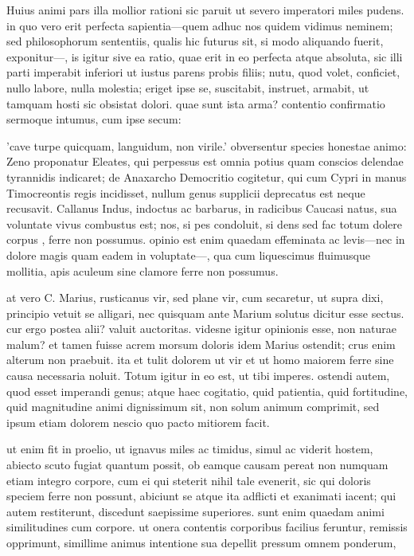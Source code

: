  Huius animi pars illa mollior rationi sic paruit ut severo imperatori miles pudens. in quo vero erit perfecta sapientia—quem adhuc nos quidem vidimus neminem; sed philosophorum sententiis, qualis hic futurus sit, si modo aliquando fuerit, exponitur—, is igitur sive ea ratio, quae erit in eo perfecta atque absoluta, sic illi parti imperabit inferiori ut iustus parens probis filiis; nutu, quod volet, conficiet, nullo labore, nulla molestia; eriget ipse se, suscitabit, instruet, armabit, ut tamquam hosti sic obsistat dolori. quae sunt ista arma? contentio confirmatio sermoque intumus, cum ipse secum:

 'cave turpe quicquam, languidum, non virile.' obversentur species honestae animo: Zeno proponatur Eleates, qui perpessus est omnia potius quam conscios delendae tyrannidis indicaret; de Anaxarcho Democritio cogitetur, qui cum Cypri in manus Timocreontis regis incidisset, nullum genus supplicii deprecatus est neque recusavit. Callanus Indus, indoctus ac barbarus, in radicibus Caucasi natus, sua voluntate vivus combustus est; nos, si pes condoluit, si dens sed fac totum dolere corpus , ferre non possumus. opinio est enim quaedam effeminata ac levis—nec in dolore magis quam eadem in voluptate—, qua cum liquescimus fluimusque mollitia, apis aculeum sine clamore ferre non possumus.

 at vero C. Marius, rusticanus vir, sed plane vir, cum secaretur, ut supra dixi, principio vetuit se alligari, nec quisquam ante Marium solutus dicitur esse sectus. cur ergo postea alii? valuit auctoritas. videsne igitur opinionis esse, non naturae malum? et tamen fuisse acrem morsum doloris idem Marius ostendit; crus enim alterum non praebuit. ita et tulit dolorem ut vir et ut homo maiorem ferre sine causa necessaria noluit. Totum igitur in eo est, ut tibi imperes. ostendi autem, quod esset imperandi genus; atque haec cogitatio, quid patientia, quid fortitudine, quid magnitudine animi dignissimum sit, non solum animum comprimit, sed ipsum etiam dolorem nescio quo pacto mitiorem facit.

 ut enim fit in proelio, ut ignavus miles ac timidus, simul ac viderit hostem, abiecto scuto fugiat quantum possit, ob eamque causam pereat non numquam etiam integro corpore, cum ei qui steterit nihil tale evenerit, sic qui doloris speciem ferre non possunt, abiciunt se atque ita adflicti et exanimati iacent; qui autem restiterunt, discedunt saepissime superiores. sunt enim quaedam animi similitudines cum corpore. ut onera contentis corporibus facilius feruntur, remissis opprimunt, simillime animus intentione sua depellit pressum omnem ponderum,


